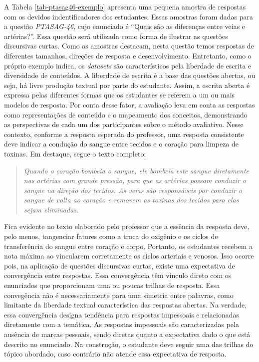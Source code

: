 A Tabela \ref{tab-ptasag46-exemplo} apresenta uma pequena amostra de respostas com os devidos indentificadores dos estudantes. Essas amostras foram dadas para a questão \textit{PTASAG-46}, cujo enunciado é ``Quais são as diferenças entre veias e artérias?''. Essa questão será utilizada como forma de ilustrar as questões discursivas curtas. Como as amostras destacam, nesta questão temos respostas de diferentes tamanhos, direções de resposta e desenvolvimento. Entretanto, como o próprio exemplo indica, os \textit{datasets} são característicos pela liberdade de escrita e diversidade de conteúdos. A liberdade de escrita é a base das questões abertas, ou seja, há livre produção textual por parte do estudante. Assim, a escrita aberta é expressa pelas diferentes formas que os estudantes se referem a um ou mais modelos de resposta. Por conta desse fator, a avaliação leva em conta as respostas como representações de conteúdo e o mapeamento dos conceitos, demonstrando as perspectivas de cada um dos participantes sobre o método avaliativo. Nesse contexto, conforme a resposta esperada do professor, uma resposta consistente deve indicar a condução do sangue entre tecidos e o coração para limpeza de toxinas. Em destaque, segue o texto completo: 

\begin{quote}
\textit{Quando o coração bombeia o sangue, ele bombeia este sangue diretamente nas artérias com grande pressão, para que as artérias possam conduzir o sangue na direção dos tecidos. As veias são responsáveis por conduzir o sangue de volta ao coração e removem as toxinas dos tecidos para elas sejam eliminadas.}
\end{quote}

Fica evidente no texto elaborado pelo professor que a essência da resposta deve, pelo menos, tangenciar fatores como a troca do oxigênio e os ciclos de transferência do sangue entre coração e corpo. Portanto, os estudantes recebem a nota máxima ao vincularem corretamente os ciclos arteriais e venosos. Isso ocorre pois, na aplicação de questões discursivas curtas, existe uma expectativa de convergência entre respostas. Essa convergência têm vínculo direto com os enunciados que proporcionam uma ou poucas trilhas de resposta. Essa convegência não é necessariamente para uma simetria entre palavras, como limitante da liberdade textual característica das respostas abertas. Na verdade, essa convergência designa tendência para respostas impessoais e relacionadas diretamente com a temática. As respostas impessoais são caracterizadas pela ausência de marcas pessoais, sendo diretas quanto a expectativa dado o que está descrito no enunciado. Na construção, o estudante deve seguir uma das trilhas do tópico abordado, caso contrário não atende essa expectativa de resposta.


